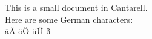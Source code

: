 \documentclass{article}
\begin{document}
This is a small document in Cantarell.
\\
Here are some German characters:
\\
äÄ öÖ üÜ ß
\end{document}
